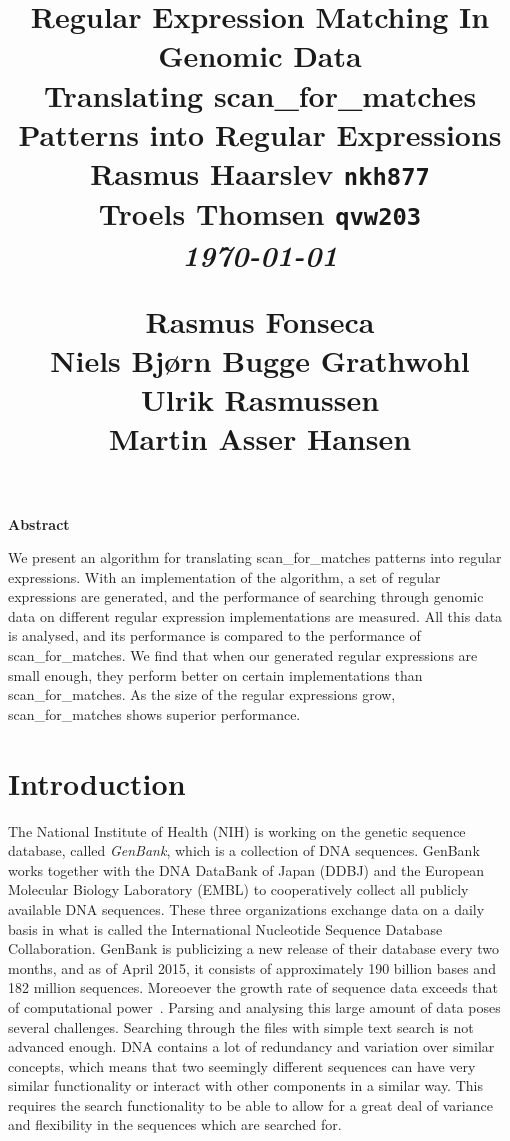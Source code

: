 \documentclass[12pt]{article}
\title{
  \vspace{4cm}
  \Large{\textbf{Regular Expression Matching In Genomic Data}} \\
  \vspace{0.3cm}
  \large{Translating scan\_for\_matches Patterns into Regular Expressions}
  \vspace{1cm}
  \normalsize 
  Rasmus Haarslev \texttt{nkh877} \\
  Troels Thomsen \texttt{qvw203} \\
  \textit{\small \today}
  \begin{flushleft}
  \vspace{10cm}
  \small
  {Rasmus Fonseca\\
   Niels Bjørn Bugge Grathwohl\\
   Ulrik Rasmussen\\
   Martin Asser Hansen}
  \end{flushleft}
}
\date{
}
\theoremstyle{definition}
\def \ColourPDF {include/ku-farve}
\def \TitlePDF {include/nat-en}  %
\begin{document}

\clearpage
{}
\thispagestyle{empty}
\maketitle

\begin{center}
\textbf{Abstract}
\end{center}

\vspace{0.5cm}

We present an algorithm for translating scan\_for\_matches patterns into regular expressions. With an implementation of the algorithm, a set of regular expressions are generated, and the performance of searching through genomic data on different regular expression implementations are measured. All this data is analysed, and its performance is compared to the performance of scan\_for\_matches. We find that when our generated regular expressions are small enough, they perform better on certain implementations than scan\_for\_matches. As the size of the regular expressions grow, scan\_for\_matches shows superior performance.

\newpage

\tableofcontents
\newpage

\pagestyle{fancy}
\fancyhf{}
\rhead{\today}
\cfoot{\thepage}


\section{Introduction}

The National Institute of Health (NIH) is working on the genetic sequence database, called \emph{GenBank}, which is a collection of DNA sequences. GenBank works together with the DNA DataBank of Japan (DDBJ) and the European Molecular Biology Laboratory (EMBL) to cooperatively collect all publicly available DNA sequences. These three organizations exchange data on a daily basis in what is called the International Nucleotide Sequence Database Collaboration. GenBank is publicizing a new release of their database every two months, and as of April 2015, it consists of approximately 190 billion bases and 182 million sequences. Moreoever the growth rate of sequence data exceeds that of computational power~\cite{GenBank}. Parsing and analysing this large amount of data poses several challenges. Searching through the files with simple text search is not advanced enough. DNA contains a lot of redundancy and variation over similar concepts, which means that two seemingly different sequences can have very similar functionality or interact with other components in a similar way. This requires the search functionality to be able to allow for a great deal of variance and flexibility in the sequences which are searched for.
\end{document}
